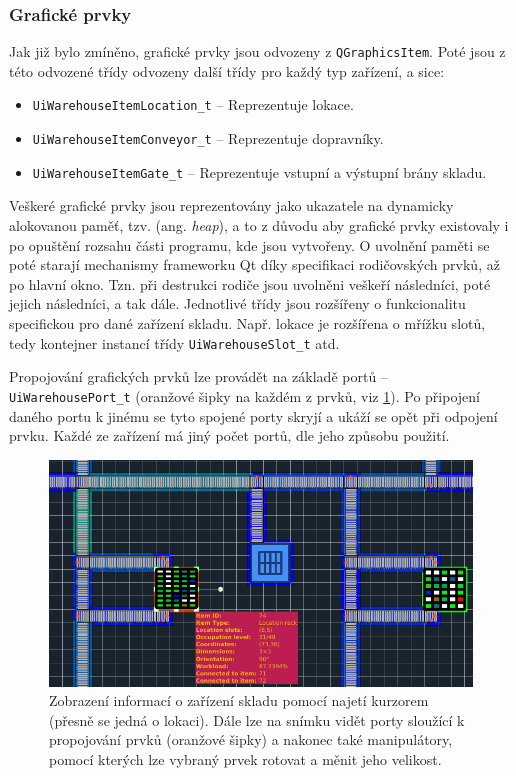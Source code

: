 \subsubsection{Grafické prvky}
Jak již bylo zmíněno, grafické prvky jsou odvozeny z \texttt{QGraphicsItem}. Poté jsou z této odvozené třídy odvozeny další třídy pro každý typ zařízení, a sice:

\begin{itemize}
    \item \texttt{UiWarehouseItemLocation\_t} -- Reprezentuje lokace.
    \item \texttt{UiWarehouseItemConveyor\_t} -- Reprezentuje dopravníky.
    \item \texttt{UiWarehouseItemGate\_t} -- Reprezentuje vstupní a výstupní brány skladu.
\end{itemize}

Veškeré grafické prvky jsou reprezentovány jako ukazatele na dynamicky alokovanou paměť, tzv.  (ang. \emph{heap}), a to z důvodu aby grafické prvky existovaly i po opuštění rozsahu části programu, kde jsou vytvořeny. O uvolnění paměti se poté starají mechanismy frameworku Qt díky specifikaci rodičovských prvků, až po hlavní okno. Tzn. při destrukci rodiče jsou uvolněni veškeří následníci, poté jejich následníci, a tak dále. Jednotlivé třídy jsou rozšířeny o funkcionalitu specifickou pro dané zařízení skladu. Např. lokace je rozšířena o mřížku slotů, tedy kontejner instancí třídy \texttt{UiWarehouseSlot\_t} atd.

Propojování grafických prvků lze provádět na základě portů -- \texttt{UiWarehousePort\_t} (oranžové šipky na každém z prvků, viz \ref{fig:uiItemInfo}). Po připojení daného portu k jinému se tyto spojené porty skryjí a ukáží se opět při odpojení prvku. Každé ze zařízení má jiný počet portů, dle jeho způsobu použití.

\begin{figure}[t]
    \centering
    \includegraphics[width=0.95\linewidth]{figures/implementace/UI_model_info.png}
    \caption{Zobrazení informací o zařízení skladu pomocí najetí kurzorem (přesně se jedná o lokaci). Dále lze na snímku vidět porty sloužící k propojování prvků (oranžové šipky) a nakonec také manipulátory, pomocí kterých lze vybraný prvek rotovat a měnit jeho velikost.}
    \label{fig:uiItemInfo}
\end{figure}


